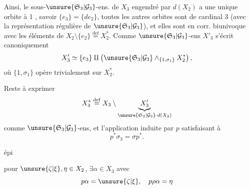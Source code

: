 
Ainsi, le sous-$\unsure{\mathfrak S_3|\mathcal G_3}$-ens.  de $X_3$ engendré par $d(X_2)$ a une unique orbite à 1 , savoir $\{e_3\}=\{de_2\}$, toutes les autres orbites sont de cardinal 3  (avec la représentation régulière de $\unsure{\mathfrak S_3|\mathcal G_3}$), et elles sont en corr. biunivoque avec les éléments de $X_2\setminus\{e_2\}\overset{\mathrm{def}}=X_2^*$. Comme $\unsure{\mathfrak S_3|\mathcal G_3}$-ens $X'_3$ s'écrit canoniquement
\[
X'_3\simeq\{e_3\}\amalg\left(\unsure{\mathfrak S_3|\mathcal G_3}\wedge_{\{1,\sigma_1\}}X_2^*\right),
\]
où $\{1,\sigma_1\}$ opère trivialement sur $X_2^*$.


Reste à exprimer
\[
X_3^*\overset{\mathrm{def}}=X_3\setminus\underbrace{X'_3}_{\unsure{\mathfrak S_3|\mathcal G_3}\cdot d(X_2)}
\]
comme $\unsure{\mathfrak S_3|\mathcal G_3}$-ens, et l'application induite par $p$
satisfaisant à
\[
\boxed{p^*\sigma_3=\sigma p^*}.
\]

épi


pour $\unsure{\zeta|\xi},\eta\in X_2$, $\exists\alpha\in X_3$ avec
\[
p\alpha=\unsure{\zeta|\xi},\quad p\rho\alpha=\eta
\]

